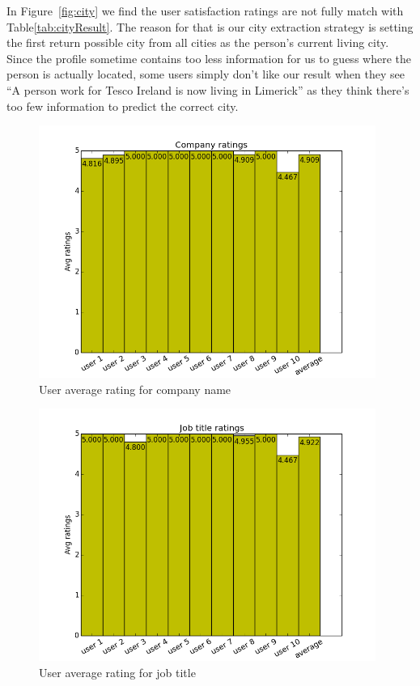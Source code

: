 In Figure~\ref{fig:city} we find the user satisfaction ratings are not fully match with Table\ref{tab:cityResult}. The reason for that is our city extraction strategy is setting the first return possible city from all cities as the person's current living city. Since the profile sometime contains too less information for us to guess where the person is actually located, some users simply don't like our result when they see ``A person work for Tesco Ireland is now living in Limerick'' as they think there's too few information to predict the correct city.

\begin{figure}[H]
\centering
\includegraphics[width=110mm]{images/evaluation/average_company_score.png}
\caption{User average rating for company name}
\label{fig:company}
\end{figure}

\begin{figure}[H]
\centering
\includegraphics[width=110mm]{images/evaluation/average_job_title_score.png}
\caption{User average rating for job title}
\label{fig:job_title}
\end{figure}

